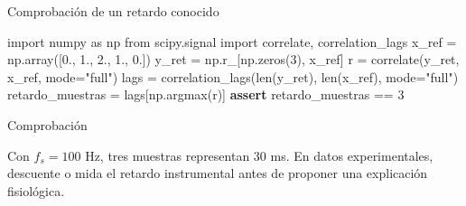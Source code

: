 \documentclass[
  10pt,
  ignorenonframetext,
  aspectratio=169,
  spanish,
]{beamer}
\newenvironment{Shaded}{\begin{snugshade}}{\end{snugshade}}
\newcommand{\BuiltInTok}[1]{\textcolor[rgb]{0.00,0.23,0.31}{#1}}
\newcommand{\ControlFlowTok}[1]{\textcolor[rgb]{0.00,0.23,0.31}{\textbf{#1}}}
\newcommand{\DecValTok}[1]{\textcolor[rgb]{0.68,0.00,0.00}{#1}}
\newcommand{\FloatTok}[1]{\textcolor[rgb]{0.68,0.00,0.00}{#1}}
\newcommand{\ImportTok}[1]{\textcolor[rgb]{0.00,0.46,0.62}{#1}}
\newcommand{\NormalTok}[1]{\textcolor[rgb]{0.00,0.23,0.31}{#1}}
\newcommand{\OperatorTok}[1]{\textcolor[rgb]{0.37,0.37,0.37}{#1}}
\newcommand{\StringTok}[1]{\textcolor[rgb]{0.13,0.47,0.30}{#1}}
\begin{document}
\begin{frame}[fragile]{Comprobación de un retardo conocido}
\label{d1-059}
\begin{Shaded}
\begin{Highlighting}[]
\ImportTok{import}\NormalTok{ numpy }\ImportTok{as}\NormalTok{ np}
\ImportTok{from}\NormalTok{ scipy.signal }\ImportTok{import}\NormalTok{ correlate, correlation\_lags}
\NormalTok{x\_ref }\OperatorTok{=}\NormalTok{ np.array([}\FloatTok{0.}\NormalTok{, }\FloatTok{1.}\NormalTok{, }\FloatTok{2.}\NormalTok{, }\FloatTok{1.}\NormalTok{, }\FloatTok{0.}\NormalTok{])}
\NormalTok{y\_ret }\OperatorTok{=}\NormalTok{ np.r\_[np.zeros(}\DecValTok{3}\NormalTok{), x\_ref]}
\NormalTok{r }\OperatorTok{=}\NormalTok{ correlate(y\_ret, x\_ref, mode}\OperatorTok{=}\StringTok{"full"}\NormalTok{)}
\NormalTok{lags }\OperatorTok{=}\NormalTok{ correlation\_lags(}\BuiltInTok{len}\NormalTok{(y\_ret), }\BuiltInTok{len}\NormalTok{(x\_ref), mode}\OperatorTok{=}\StringTok{"full"}\NormalTok{)}
\NormalTok{retardo\_muestras }\OperatorTok{=}\NormalTok{ lags[np.argmax(r)]}
\ControlFlowTok{assert}\NormalTok{ retardo\_muestras }\OperatorTok{==} \DecValTok{3}
\end{Highlighting}
\end{Shaded}

\begin{block}{Comprobación}

Con \(f_s=100\) Hz, tres muestras representan 30 ms. En datos
experimentales, descuente o mida el retardo instrumental antes de
proponer una explicación fisiológica.

\end{block}

\end{frame}
\end{document}
